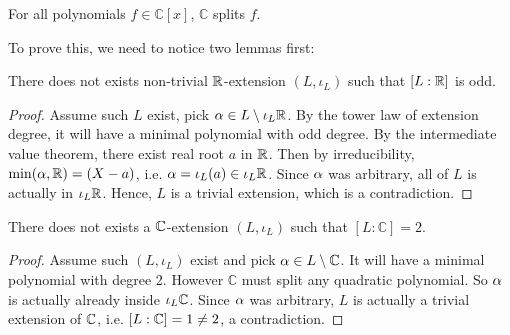 \documentclass[../book.tex]{subfiles}
\begin{document}
\begin{thm}
    For all polynomials $f \in \mathbb{C}[x]$, $\mathbb{C}$ splits $f$.
\end{thm}

To prove this, we need to notice two lemmas first:

\begin{lem}
    There does not exists non-trivial $\mathbb{R}$-extension $(L,\iota_L)$ 
    such that $[L : \mathbb{R}]$ is odd.
\end{lem}
\begin{proof}
    Assume such $L$ exist, pick $ \alpha \in L\setminus \iota_L\mathbb{R}$.
    By the tower law of extension degree, 
    it will have a minimal polynomial with odd degree. 
    By the intermediate value theorem, there exist real root $a$ in $\mathbb{R}$.
    Then by irreducibility, $\min(\alpha,\mathbb{R}) = (X - a)$, 
    i.e. $\alpha = \iota_L(a) \in \iota_L\mathbb{R}$.
    Since $\alpha$ was arbitrary, all of $L$ is actually in $\iota_L\mathbb{R}$.
    Hence, $L$ is a trivial extension, which is a contradiction. 
    
\end{proof}
\begin{lem}
    There does not exists a $\mathbb{C}$-extension $(L,\iota_L)$ 
    such that $[L : \mathbb{C}]=2$.
\end{lem}
\begin{proof}
    Assume such $(L,\iota_L)$ exist and 
    pick $ \alpha \in L \setminus \mathbb{C}$. 
    It will have a minimal polynomial with degree 2. 
    However $\mathbb{C}$ must split any quadratic polynomial.
    So $\alpha$ is actually already inside $\iota_L \mathbb{C}$.
    Since $\alpha$ was arbitrary, $L$ is actually a trivial extension of $\mathbb{C}$,
    i.e. $[L : \mathbb{C}] = 1 \neq 2$, a contradiction. 
\end{proof}
\end{document}
